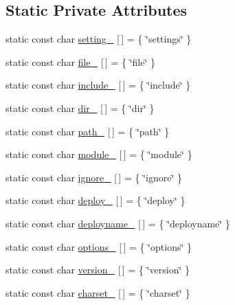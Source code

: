 \subsection*{Static Private Attributes}
\begin{DoxyCompactItemize}
\item 
static const char \hyperlink{classmocha_1_1_x_m_l_reader_aaf5e2fc0d87c47b98cc6f8db550d5af9}{setting\_\-} \mbox{[}$\,$\mbox{]} = \{ \char`\"{}settings\char`\"{} \}
\item 
static const char \hyperlink{classmocha_1_1_x_m_l_reader_a01924180e01a5125b2442b58da57a856}{file\_\-} \mbox{[}$\,$\mbox{]} = \{ \char`\"{}file\char`\"{} \}
\item 
static const char \hyperlink{classmocha_1_1_x_m_l_reader_ad1a6dff4c5b1c8d3c697f7759022c4b5}{include\_\-} \mbox{[}$\,$\mbox{]} = \{ \char`\"{}include\char`\"{} \}
\item 
static const char \hyperlink{classmocha_1_1_x_m_l_reader_a129a6a3323241afb155f6441c55773af}{dir\_\-} \mbox{[}$\,$\mbox{]} = \{ \char`\"{}dir\char`\"{} \}
\item 
static const char \hyperlink{classmocha_1_1_x_m_l_reader_a8b2209cc78c1b2c380fc77e8663c3677}{path\_\-} \mbox{[}$\,$\mbox{]} = \{ \char`\"{}path\char`\"{} \}
\item 
static const char \hyperlink{classmocha_1_1_x_m_l_reader_a791eea80c3f0c419f6582c87b2a9b631}{module\_\-} \mbox{[}$\,$\mbox{]} = \{ \char`\"{}module\char`\"{} \}
\item 
static const char \hyperlink{classmocha_1_1_x_m_l_reader_a749252cf2d5c3cf2913f6e3cfb281102}{ignore\_\-} \mbox{[}$\,$\mbox{]} = \{ \char`\"{}ignore\char`\"{} \}
\item 
static const char \hyperlink{classmocha_1_1_x_m_l_reader_ae48618b8cf404da69071b422fea6f7e8}{deploy\_\-} \mbox{[}$\,$\mbox{]} = \{ \char`\"{}deploy\char`\"{} \}
\item 
static const char \hyperlink{classmocha_1_1_x_m_l_reader_acf67bd089a4dd7bf722f6c4112ef3970}{deployname\_\-} \mbox{[}$\,$\mbox{]} = \{ \char`\"{}deployname\char`\"{} \}
\item 
static const char \hyperlink{classmocha_1_1_x_m_l_reader_ae72442abf51c27715281622f68e6f238}{options\_\-} \mbox{[}$\,$\mbox{]} = \{ \char`\"{}options\char`\"{} \}
\item 
static const char \hyperlink{classmocha_1_1_x_m_l_reader_a8a90655c87ea52747d0da94c3e992b6d}{version\_\-} \mbox{[}$\,$\mbox{]} = \{ \char`\"{}version\char`\"{} \}
\item 
static const char \hyperlink{classmocha_1_1_x_m_l_reader_a3d7781f09d113fe583a36e44a9442428}{charset\_\-} \mbox{[}$\,$\mbox{]} = \{ \char`\"{}charset\char`\"{} \}
\end{DoxyCompactItemize}



